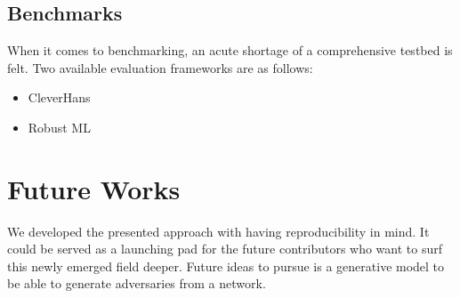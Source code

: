 \documentclass[letterpaper,12pt]{article}
\begin{document}
\subsection{Benchmarks}
When it comes to benchmarking, an acute shortage of a comprehensive testbed is felt. Two available evaluation frameworks are as follows:
\begin{itemize}
    \item CleverHans \cite{Papernot2016}
    \item Robust ML 
\end{itemize}
 

\section{Future Works}
We developed the presented approach with having reproducibility in mind. It could be served as a launching pad for the future contributors who want to surf this newly emerged field deeper. Future ideas to pursue is a generative model to be able to generate adversaries from a network.





\end{document}
